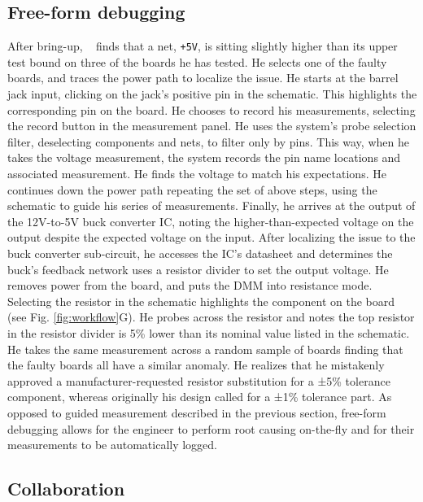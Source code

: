 \documentclass [11pt, proquest] {uwthesis}[2020/02/24]
\begin{document}
\subsection{Free-form debugging}

After bring-up, \personname~ finds that a net, \verb|+5V|, is sitting slightly higher than its upper test bound on three of the boards he has tested. He selects one of the faulty boards, and traces the power path to localize the issue. He starts at the barrel jack input, clicking on the jack's positive pin in the schematic. This highlights the corresponding pin on the board. He chooses to record his measurements, selecting the record button in the measurement panel. He uses the system’s probe selection filter, deselecting components and nets, to filter only by pins. This way, when he takes the voltage measurement, the system records the pin name locations and associated measurement. He finds the voltage to match his expectations. He continues down the power path repeating the set of above steps, using the schematic to guide his series of measurements. Finally, he arrives at the output of the 12V-to-5V buck converter IC, noting the higher-than-expected voltage on the output despite the expected voltage on the input. After localizing the issue to the buck converter sub-circuit, he accesses the IC’s datasheet and determines the buck’s feedback network uses a resistor divider to set the output voltage. He removes power from the board, and puts the DMM into resistance mode. Selecting the resistor in the schematic highlights the component on the board  (see Fig. \ref{fig:workflow}G). He probes across the resistor and notes the top resistor in the resistor divider is 5\% lower than its nominal value listed in the schematic. He takes the same measurement across a random sample of boards finding that the faulty boards all have a similar anomaly. He realizes that he mistakenly approved a manufacturer-requested resistor substitution for a ±5\% tolerance component, whereas originally his design called for a ±1\% tolerance part. As opposed to guided measurement described in the previous section, free-form debugging allows for the engineer to perform root causing on-the-fly and for their measurements to be automatically logged.

\subsection{Collaboration}
\end{document}
